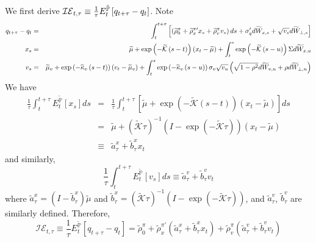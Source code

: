 \documentclass{article}
\begin{document}
We first derive $\mathcal{IE}_{t,\tau }\equiv \frac{1}{\tau }E_{t}^{\mathbb{%
\tilde{P}}}\left[ q_{t+\tau }-q_{t}\right] $. Note 
\begin{eqnarray*}
q_{t+\tau }-q_{t} &=&\int_{t}^{t+\tau }\left[ \left( \widetilde{\rho }%
_{0}^{\pi }+\widetilde{\rho }_{x}^{\pi \prime }x_{s}+\widetilde{\rho }%
_{v}^{\pi }v_{s}\right) ds+\sigma _{q}^{\prime }d\widetilde{W}_{x,s}+\sqrt{%
v_{s}}d\widetilde{W}_{\bot ,s}\right]  \\
x_{s} &=&\widetilde{\mu }+\exp \left( -\widetilde{\mathcal{K}}\left(
s-t\right) \right) \left( x_{t}-\widetilde{\mu }\right) +\int_{t}^{s}\exp
\left( -\widetilde{\mathcal{K}}\left( s-u\right) \right) \Sigma d\widetilde{W%
}_{x,u} \\
v_{s} &=&\widetilde{\mu }_{v}+\exp \left( -\widetilde{\kappa }_{v}\left(
s-t\right) \right) \left( v_{t}-\widetilde{\mu }_{v}\right)
+\int_{t}^{s}\exp \left( -\widetilde{\kappa }_{v}\left( s-u\right) \right)
\sigma _{v}\sqrt{v_{u}}\left( \sqrt{1-\rho ^{2}}d\widetilde{W}_{v,u}+\rho d%
\widetilde{W}_{\bot ,u}\right) 
\end{eqnarray*}%
We have%
\begin{eqnarray*}
\frac{1}{\tau }\int_{t}^{t+\tau }E_{t}^{\mathbb{\tilde{P}}}\left[ x_{s}%
\right] ds &=&\frac{1}{\tau }\int_{t}^{t+\tau }\left[ \widetilde{\mu }+\exp
\left( -\widetilde{\mathcal{K}}\left( s-t\right) \right) \left( x_{t}-%
\widetilde{\mu }\right) \right] ds \\
&=&\widetilde{\mu }+\left( \mathcal{\tilde{K}}\tau \right) ^{-1}\left(
I-\exp \left( -\mathcal{\tilde{K}}\tau \right) \right) \left( x_{t}-%
\widetilde{\mu }\right)  \\
&\equiv &\tilde{a}_{\tau }^{x}+\tilde{b}_{\tau }^{x}x_{t}
\end{eqnarray*}%
and similarly,%
\begin{equation*}
\frac{1}{\tau }\int_{t}^{t+\tau }E_{t}^{\mathbb{\tilde{P}}}\left[ v_{s}%
\right] ds\equiv \tilde{a}_{\tau }^{v}+\tilde{b}_{\tau }^{v}v_{t}
\end{equation*}%
where $\tilde{a}_{\tau }^{x}=\left( I-\tilde{b}_{\tau }^{x}\right) \tilde{\mu%
}$ and $\tilde{b}_{\tau }^{x}=\left( \mathcal{\tilde{K}}\tau \right)
^{-1}\left( I-\exp \left( -\mathcal{\tilde{K}}\tau \right) \right) $, and $%
\tilde{a}_{\tau }^{v}$, $\tilde{b}_{\tau }^{v}$ are similarly defined.
Therefore,%
\begin{equation*}
\mathcal{IE}_{t,\tau }\equiv \frac{1}{\tau }E_{t}^{\mathbb{\tilde{P}}}\left[
q_{t+\tau }-q_{t}\right] =\widetilde{\rho }_{0}^{\pi }+\widetilde{\rho }%
_{x}^{\pi \prime }\left( \tilde{a}_{\tau }^{x}+\tilde{b}_{\tau
}^{x}x_{t}\right) +\widetilde{\rho }_{v}^{\pi }\left( \tilde{a}_{\tau }^{v}+%
\tilde{b}_{\tau }^{v}v_{t}\right) 
\end{equation*}
\end{document}

